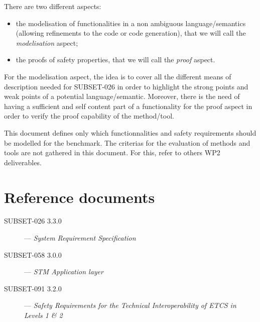 \documentclass{template/openetcs_report}
\begin{document}
There are two different aspects:
\begin{itemize}
\item the modelisation of functionalities in a non ambiguous language/semantics (allowing refinements to the code or code generation), that we will call the \emph{modelisation} aspect;
\item the proofs of safety properties, that we will call the \emph{proof} aspect.
\end{itemize}

For the modelisation aspect, the idea is to cover all the different means of description needed for SUBSET-026 in order to highlight the strong points and weak points of a potential language/semantic.
Moreover, there is the need of having a sufficient and self content part of a functionality for the proof aspect in order to verify the proof capability of the method/tool.

This document defines only which functionnalities and safety requirements should be modelled for the benchmark. The criterias for the evaluation of methods and tools are not gathered in this document. For this, refer to others WP2 deliverables. 

\chapter{Reference documents}
\begin{description}
\item [SUBSET-026 3.3.0] --- \emph{System Requirement Specification}
\item [SUBSET-058 3.0.0] --- \emph{STM Application layer}
\item [SUBSET-091 3.2.0] --- \emph{Safety Requirements for the Technical Interoperability of ETCS in Levels 1 \& 2}
\end{description}
\end{document}
